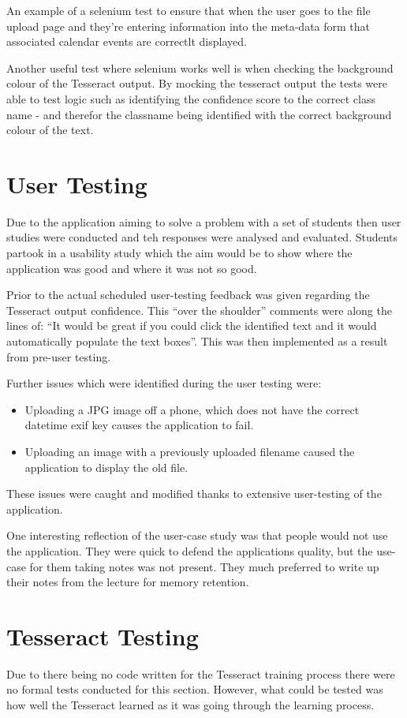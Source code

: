 An example of a selenium test to ensure that when the user goes to the file upload page and they're entering information into the meta-data form that associated calendar events are correctlt displayed.

Another useful test where selenium works well is when checking the background colour of the Tesseract output. By mocking the tesseract output the tests were able to test logic such as identifying the confidence score to the correct class name - and therefor the classname being identified with the correct background colour of the text.
\section{User Testing}
Due to the application aiming to solve a problem with a set of students then user studies were conducted and teh responses were analysed and evaluated. Students partook in a usability study which the aim would be to show where the application was good and where it was not so good.

Prior to the actual scheduled user-testing feedback was given regarding the Tesseract output confidence. This ``over the shoulder'' comments were along the lines of: ``It would be great if you could click the identified text and it would automatically populate the text boxes''. This was then implemented as a result from pre-user testing.

Further issues which were identified during the user testing were:
\begin{itemize}
  \item Uploading a JPG image off a phone, which does not have the correct datetime exif key causes the application to fail.
  \item Uploading an image with a previously uploaded filename caused the application to display the old file.
\end{itemize}

These issues were caught and modified thanks to extensive user-testing of the application.

One interesting reflection of the user-case study was that people would not use the application. They were quick to defend the applications quality, but the use-case for them taking notes was not present. They much preferred to write up their notes from the lecture for memory retention.
\section{Tesseract Testing}
Due to there being no code written for the Tesseract training process there were no formal tests conducted for this section. However, what could be tested was how well the Tesseract learned as it was going through the learning process.

